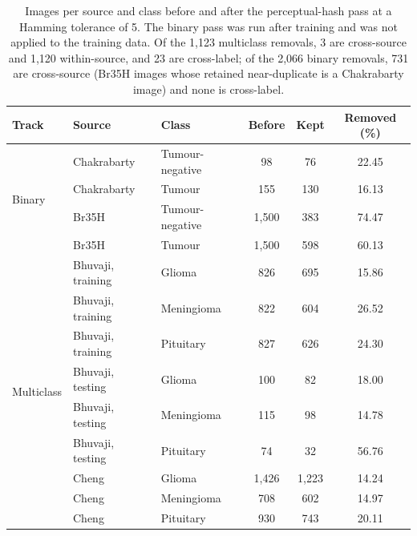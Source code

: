 \documentclass[11pt]{article}
\newcommand{\tablenumber}[1]{\setcounter{table}{\numexpr#1-1\relax}}
\begin{document}
\begin{table}[htbp]
\tablenumber{11}
\centering
\caption{Images per source and class before and after the perceptual-hash pass at a Hamming tolerance of 5. The binary pass was run after training and was not applied to the training data. Of the 1,123 multiclass removals, 3 are cross-source and 1,120 within-source, and 23 are cross-label; of the 2,066 binary removals, 731 are cross-source (Br35H images whose retained near-duplicate is a Chakrabarty image) and none is cross-label.}
\label{tab:s11}
\small
\begin{tabular*}{\textwidth}{@{\extracolsep{\fill}}lllccc@{}}
\toprule
Track & Source & Class & Before & Kept & Removed (\%) \\
\midrule
\multirow{4}{*}{Binary} & Chakrabarty & Tumour-negative & 98 & 76 & 22.45 \\
 & Chakrabarty & Tumour & 155 & 130 & 16.13 \\
 & Br35H & Tumour-negative & 1,500 & 383 & 74.47 \\
 & Br35H & Tumour & 1,500 & 598 & 60.13 \\
\midrule
\multirow{9}{*}{Multiclass} & Bhuvaji, training & Glioma & 826 & 695 & 15.86 \\
 & Bhuvaji, training & Meningioma & 822 & 604 & 26.52 \\
 & Bhuvaji, training & Pituitary & 827 & 626 & 24.30 \\
 & Bhuvaji, testing & Glioma & 100 & 82 & 18.00 \\
 & Bhuvaji, testing & Meningioma & 115 & 98 & 14.78 \\
 & Bhuvaji, testing & Pituitary & 74 & 32 & 56.76 \\
 & Cheng & Glioma & 1,426 & 1,223 & 14.24 \\
 & Cheng & Meningioma & 708 & 602 & 14.97 \\
 & Cheng & Pituitary & 930 & 743 & 20.11 \\
\bottomrule
\end{tabular*}
\end{table}
\end{document}
